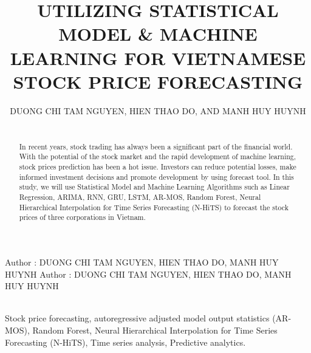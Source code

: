 \documentclass{ieeeojies}
\begin{document}
\title{UTILIZING STATISTICAL MODEL & MACHINE LEARNING FOR VIETNAMESE STOCK PRICE FORECASTING}

\author{\uppercase{DUONG CHI TAM NGUYEN},
\uppercase{HIEN THAO DO, and MANH HUY HUYNH}}

\address[1]{Faculty of Information Systems, University of Information Technology, (e-mail: 21520439@gm.uit.edu.vn)}
\address[2]{Faculty of Information Systems, University of Information Technology, (e-mail: 21520460@gm.uit.edu.vn)}
\address[3]{Faculty of Information Systems, University of Information Technology, (e-mail: 21520259@gm.uit.edu.vn)}

\markboth
{Author \headeretal: DUONG CHI TAM NGUYEN, HIEN THAO DO, MANH HUY HUYNH}
{Author \headeretal: DUONG CHI TAM NGUYEN, HIEN THAO DO, MANH HUY HUYNH}

\begin{abstract}
\\In recent years, stock trading has always been a significant part of the financial world. With the potential of the stock market and the rapid development of machine learning, stock prices prediction has been a hot issue. Investors can reduce potential losses, make informed investment decisions and promote development by using forecast tool. In this study, we will use Statistical Model and Machine Learning Algorithms such as Linear Regression, ARIMA, RNN, GRU, LSTM, AR-MOS, Random Forest, Neural Hierarchical Interpolation for Time Series Forecasting (N-HiTS) to forecast the stock prices of three corporations in Vietnam.
\end{abstract}

\begin{keywords}
\\Stock price forecasting, autoregressive adjusted model output statistics (AR-MOS), Random Forest, Neural Hierarchical Interpolation for Time Series Forecasting (N-HiTS), Time series analysis, Predictive analytics.
\end{keywords}

\titlepgskip=-15pt

\maketitle
\end{document}
